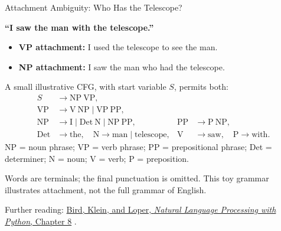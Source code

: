 \documentclass[10pt]{beamer}
\newcommand{\paperlink}[2]{%
  \href{#1}{\textcolor{blue!65!black}{#2}}%
}
\begin{document}
\begin{frame}{Attachment Ambiguity: Who Has the Telescope?}
  \small
  \begin{center}
    \textbf{``I saw the man with the telescope.''}
  \end{center}
  \begin{itemize}
    \item \textbf{VP attachment:} I used the telescope to see the man.
    \item \textbf{NP attachment:} I saw the man who had the telescope.
  \end{itemize}
  \pause
  A small illustrative CFG, with start variable $S$, permits both:
  \[
    \begin{aligned}
      S&\to \mathrm{NP}\ \mathrm{VP},\\
      \mathrm{VP}&\to \mathrm{V}\ \mathrm{NP}\mid\mathrm{VP}\ \mathrm{PP},\\
      \mathrm{NP}&\to\text{I}\mid\mathrm{Det}\ \mathrm{N}\mid\mathrm{NP}\ \mathrm{PP},
      &\mathrm{PP}&\to\mathrm{P}\ \mathrm{NP},\\
      \mathrm{Det}&\to\text{the},\quad \mathrm{N}\to\text{man}\mid\text{telescope},
      &\mathrm{V}&\to\text{saw},\quad\mathrm{P}\to\text{with}.
    \end{aligned}
  \]
  NP = noun phrase; VP = verb phrase; PP = prepositional phrase;
  Det = determiner; N = noun; V = verb; P = preposition.
  \par\smallskip
  Words are terminals; the final punctuation is omitted. This toy grammar
  illustrates attachment, not the full grammar of English.
  \par\smallskip
  {\footnotesize Further reading: \paperlink{https://www.nltk.org/book/ch08.html}
    {Bird, Klein, and Loper, \emph{Natural Language Processing with Python}, Chapter 8}.}
\end{frame}
\end{document}
